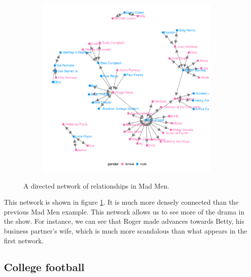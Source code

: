 \begin{figure}[hbtp]
\begin{subfigure}[t]{\textwidth}
\begin{adjustbox}{valign=t}
\begin{minipage}{.49\textwidth}
                   \end{minipage}

                  \begin{minipage}{.49\textwidth}

\includegraphics[width=\textwidth]{figure/madmen2_ggnetwork-1.pdf}

                          \end{minipage}

                          \end{adjustbox}
\end{subfigure}
\caption{\label{fig.cap:madmen2} A directed network of relationships in Mad Men.}
\end{figure}
\afterpage{\clearpage}

This network is shown in figure \ref{fig.cap:madmen2}.  It is much more densely connected than the previous Mad Men example.  This network allows us to see more of the drama in the show. For instance, we can see that Roger made advances towards Betty, his business partner's wife, which is much more scandalous than what appears in the first network.

\subsection{College football} %

